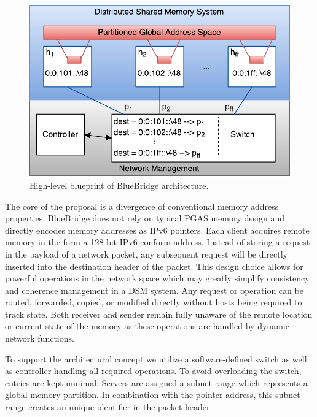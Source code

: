 \begin{figure}[t]
    \centering
    \includegraphics[width=\columnwidth]{Images/BlueBridgeMemory.pdf}
    \caption{High-level blueprint of BlueBridge architecture.}
    \label{fig:blueprint}
\end{figure}

The core of the proposal is a divergence of conventional memory address properties. BlueBridge does not rely on typical PGAS memory design and directly encodes memory addresses as IPv6 pointers. Each client acquires remote memory in the form a 128 bit IPv6-conform address. Instead of storing a request in the payload of a network packet, any subsequent request will be directly inserted into the destination header of the packet.
This design choice allows for powerful operations in the network space which may greatly simplify consistency and coherence management in a DSM system. Any request or operation can be routed, forwarded, copied, or modified directly without hosts being required to track state. Both receiver and sender remain fully unaware of the remote location or current state of the memory as these operations are handled by dynamic network functions.

To support the architectural concept we utilize a software-defined switch as well as controller handling all required operations. To avoid overloading the switch, entries are kept minimal. Servers are assigned a subnet range which represents a global memory partition. In combination with the pointer address, this subnet range creates an unique identifier in the packet header. 

